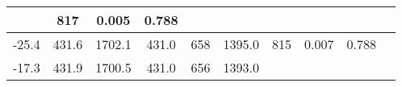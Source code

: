 \documentclass[a4paper,10pt]{article}
\begin{document}
\begin{longtable}{
     |
%    
    c|
%    
    c|
%    
    c|
%    
    c|
%    
    c|
%    
    c|
%    
    c|
%    
    c|
%    
    c|
%    
    c|
%    
    }
%        
        & 817
%        

%        

%        
        & 0.005
%        

%        

%        
        & 0.788
%        

%        
        \\
        \hline

        

%        

%        
        -25.4
%        

%        

%        
        & 431.6
%        

%        

%        
        & 1702.1
%        

%        

%        
        & 431.0
%        

%        

%        
        & 658
%        

%        

%        
        & 1395.0
%        

%        

%        
        & 815
%        

%        

%        
        & 0.007
%        

%        

%        
        & 0.788
%        

%        
        \\
        \hline

        

%        

%        
        -17.3
%        

%        

%        
        & 431.9
%        

%        

%        
        & 1700.5
%        

%        

%        
        & 431.0
%        

%        

%        
        & 656
%        

%        

%        
        & 1393.0
%        

%        


\end{longtable}
\end{document}
